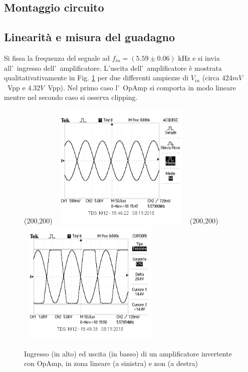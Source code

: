 \documentclass[10pt,a4paper]{article}
\begin{document}
\subsection{Montaggio circuito}

\subsection{Linearit\`a e misura del guadagno}
Si fissa la frequenza del segnale ad $f_{in} = (5.59 \pm 0.06)$ kHz e si invia all'~ingresso dell'~amplificatore.
L'uscita dell'~amplificatore \`e mostrata qualitativativamente in Fig. \ref{fig:oscinv} per due 
differenti ampiezze di $V_{in}$ (circa $424mV$~Vpp e $4.32V$~Vpp). 
Nel primo caso l'~OpAmp si comporta in modo lineare mentre nel secondo caso si osserva clipping.   
%
\begin{figure}[h]
\begin{center}
\framebox(200,200){
	\includegraphics[width=7cm,height=6cm]{screenshot/foto1.png}
}
\framebox(200,200){
	\includegraphics[width=7cm,height=6cm]{screenshot/foto2.png}
}
\end{center}
\caption{\small Ingresso (in alto) ed uscita (in basso) di un amplificatore invertente con OpAmp, in 
zona lineare (a sinistra) e non (a destra)}
\label{fig:oscinv}
\end{figure}
%
\end{document}
